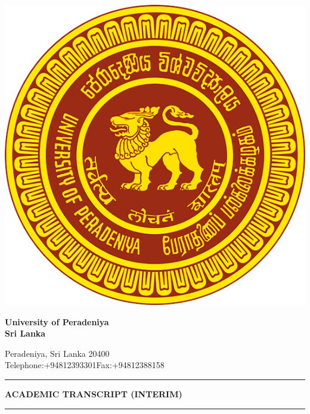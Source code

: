 \documentclass[12pt]{article}
\begin{document}
\noindent
\begin{minipage}[H]{0.17\linewidth}
\centering
\includegraphics[width=1.0\linewidth]{logo.png}
\end{minipage}%
\hfill
  \begin{minipage}[H]{0.8\linewidth}
{\fontsize{28}{30}\selectfont \textbf{University of Peradeniya\\Sri Lanka}}

\Large Peradeniya, Sri Lanka 20400\\
{\fontsize{12}{30}\selectfont Telephone:+94812393301\hfill Fax:+94812388158}


  \end{minipage}

\vspace{10pt}
\noindent\rule{\textwidth}{1pt}
\vspace{-15pt}
\begin{center}
{\fontsize{21}{30}\selectfont \textbf{ACADEMIC TRANSCRIPT (INTERIM)}}
\end{center}

\vspace{-12.5pt}

\noindent\rule{\textwidth}{1pt}
\end{document}
